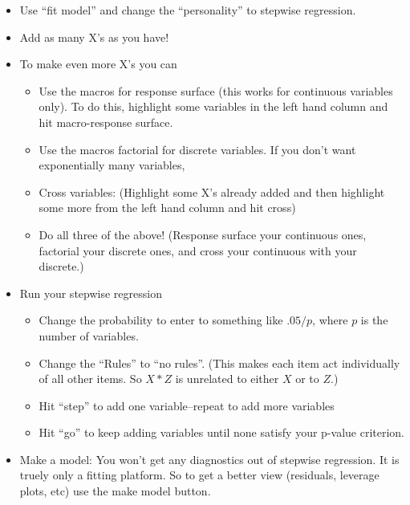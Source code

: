 \documentclass{article}
\begin{document}
\begin{itemize}
\item Use ``fit model'' and change the ``personality'' to stepwise regression.
\item Add as many X's as you have!
\item To make even more X's you can
\begin{itemize}
\item Use the macros for response surface (this works for continuous
variables only).  To do this, highlight some variables in the left
hand column and hit macro-response surface.
\item Use the macros factorial for discrete variables.  If you don't
want exponentially many variables,
\item Cross variables: (Highlight some X's already added and then
highlight some more from the left hand column and hit cross)
\item Do all three of the above!  (Response surface your continuous
ones, factorial your discrete ones, and cross your continuous with
your discrete.)
\end{itemize}
\item Run your stepwise regression 
\begin{itemize}
\item Change the probability to enter to something like $.05/p$, where $p$
is the number of variables.
\item Change the ``Rules'' to ``no rules''.  (This makes each item act
individually of all other items.  So $X*Z$ is unrelated to either $X$
or to $Z$.)
\item Hit ``step'' to add one variable--repeat to add more variables
\item Hit ``go'' to keep adding variables until none satisfy your
p-value criterion.
\end{itemize}
\item Make a model: You won't get any diagnostics out of stepwise
 regression.  It is truely only a fitting platform.  So to get a
better view (residuals, leverage plots, etc) use the make model
button. 
\end{itemize}
\end{document}
